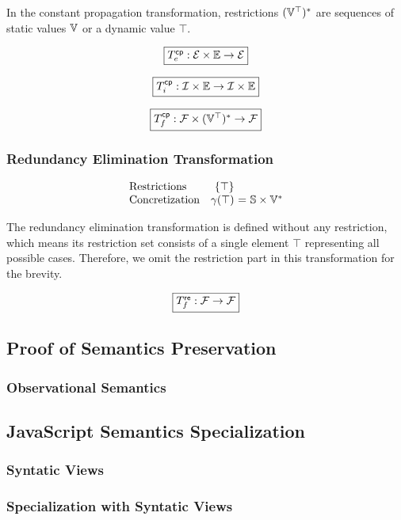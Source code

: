 In the constant propagation transformation, restrictions $(\mathbb{V}^\top)^*$ are
sequences of static values $\mathbb{V}$ or a dynamic value $\top$.

\[
  \framebox{$\transcpe: \exprset \times \envset \rightarrow \exprset$}
\]

\todo

\[
  \framebox{$\transcpi: \instset \times \envset \rightarrow \instset \times
  \envset$}
\]

\todo

\[
  \framebox{$\transcpf: \funcset \times (\valoptset)^* \rightarrow \funcset$}
\]

\todo


\subsubsection{Redundancy Elimination Transformation}

\todo

\[
  \begin{array}{lr@{~}c@{~}l}
    \text{Restrictions} &\{ \top \}\\
    \text{Concretization} & \gamma(\top) &=& \stset \times \valset^*\\
  \end{array}
\]

The redundancy elimination transformation is defined without any restriction,
which means its restriction set consists of a single element $\top$
representing all possible cases.  Therefore, we omit the restriction part in
this transformation for the brevity.

\[
  \framebox{$\transref: \funcset \rightarrow \funcset$}
\]

\todo








\subsection{Proof of Semantics Preservation}

\todo

\subsubsection{Observational Semantics}

\todo





\subsection{JavaScript Semantics Specialization}

\todo

\subsubsection{Syntatic Views}

\todo

\subsubsection{Specialization with Syntatic Views}

\todo
